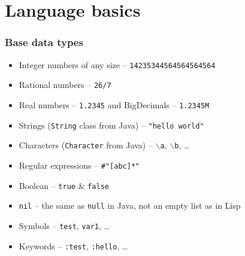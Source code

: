 \section{Language basics}

\begin{frame}[t]
  \frametitle{Base data types}
  \begin{itemize}
  \item Integer numbers of any size -- \texttt{14235344564564564564}
  \item Rational numbers -- \texttt{26/7}
  \item Real numbers -- \texttt{1.2345} and BigDecimals -- \texttt{1.2345M}
  \item Strings (\texttt{String} class from Java) -- \texttt{"hello world"}
  \item Characters (\texttt{Character} from Java) -- \texttt{$\backslash{}$a}, \texttt{$\backslash{}$b}, \ldots{}
  \item Regular expressions -- \texttt{\#"[abc]*"}
  \item Boolean -- \texttt{true} \& \texttt{false}
  \item \texttt{nil} -- the same as \texttt{null} in Java, not an empty list as in Lisp
  \item Symbols -- \texttt{test}, \texttt{var1}, \ldots{}
  \item Keywords -- \texttt{:test}, \texttt{:hello}, \ldots{}
  \end{itemize}
\end{frame}

